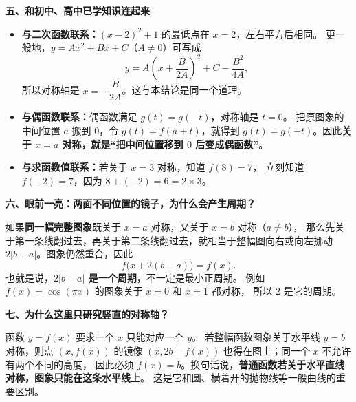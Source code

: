 \clearpage
\begin{explanationbox}
\textbf{\textcolor{CExplanation}{五、和初中、高中已学知识连起来}}


  \begin{itemize}[leftmargin=*,itemsep=0.45em,topsep=0.3em]
    \item \textbf{与二次函数联系：}$(x-2)^2+1$ 的最低点在 $x=2$，左右平方后相同。
    更一般地，$y=Ax^2+Bx+C$（$A\ne0$）可写成
    \[
      y=A\left(x+\frac{B}{2A}\right)^2+C-\frac{B^2}{4A},
    \]
    所以对称轴是 $x=-\dfrac{B}{2A}$。这与本结论是同一个道理。
    \item \textbf{与偶函数联系：}偶函数满足 $g(t)=g(-t)$，对称轴是 $t=0$。
    把原图象的中间位置 $a$ 搬到 $0$，令 $g(t)=f(a+t)$，就得到
    $g(t)=g(-t)$。因此\textbf{关于 $x=a$ 对称，就是“把中间位置移到 $0$ 后变成偶函数”}。
    \item \textbf{与求函数值联系：}若关于 $x=3$ 对称，知道 $f(8)=7$，
    立刻知道 $f(-2)=7$，因为 $8+(-2)=6=2\times3$。
  \end{itemize}

  \medskip
  
\end{explanationbox}
\clearpage
\begin{explanationbox}
\textbf{\textcolor{CExplanation}{六、眼前一亮：两面不同位置的镜子，为什么会产生周期？}}


  如果\textbf{同一幅完整图象}既关于 $x=a$ 对称，又关于 $x=b$ 对称（$a\ne b$），
  那么先关于第一条线翻过去，再关于第二条线翻过去，就相当于整幅图向右或向左挪动
  $2|b-a|$。图象仍然重合，因此
  \[
    \boxed{f\bigl(x+2(b-a)\bigr)=f(x)}.
  \]
  也就是说，\textbf{$2|b-a|$ 是一个周期}，不一定是最小正周期。
  例如 $f(x)=\cos(\pi x)$ 的图象关于 $x=0$ 和 $x=1$ 都对称，
  所以 $2$ 是它的周期。

  \medskip
  
\end{explanationbox}
\clearpage
\begin{explanationbox}
\textbf{\textcolor{CExplanation}{七、为什么这里只研究竖直的对称轴？}}


  函数 $y=f(x)$ 要求一个 $x$ 只能对应一个 $y$。
  若整幅函数图象关于水平线 $y=b$ 对称，则点 $(x,f(x))$ 的镜像
  $(x,2b-f(x))$ 也得在图上；同一个 $x$ 不允许有两个不同的高度，
  因此必须 $f(x)=b$。换句话说，\textbf{普通函数若关于水平直线对称，图象只能在这条水平线上}。
  这是它和圆、横着开的抛物线等一般曲线的重要区别。
\end{explanationbox}

